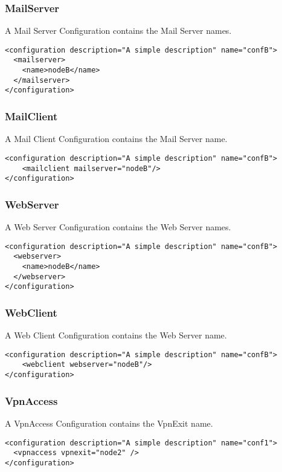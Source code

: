 \documentclass[a4paper,11pt]{article}
\begin{document}
\subsubsection*{MailServer}
A Mail Server Configuration contains the Mail Server names.
\begin{lstlisting}[label={list:ninth},caption=MailServer Configuration Example]
<configuration description="A simple description" name="confB">
  <mailserver>
  	<name>nodeB</name>
  </mailserver>
</configuration>
\end{lstlisting}
\subsubsection*{MailClient}
A Mail Client Configuration contains the Mail Server name.
\begin{lstlisting}[label={list:tenth},caption=MailClient Configuration Example]
<configuration description="A simple description" name="confB">
    <mailclient mailserver="nodeB"/>
</configuration>
\end{lstlisting}
\subsubsection*{WebServer}
A Web Server Configuration contains the Web Server names.
\begin{lstlisting}[label={list:eleventh},caption=WebServer Configuration Example]
<configuration description="A simple description" name="confB">
  <webserver>
  	<name>nodeB</name>
  </webserver>
</configuration>
\end{lstlisting}
\subsubsection*{WebClient}
A Web Client Configuration contains the Web Server name.
\begin{lstlisting}[label={list:twelfth},caption=Web Client Configuration Example]
<configuration description="A simple description" name="confB">
    <webclient webserver="nodeB"/>
</configuration>
\end{lstlisting}
\subsubsection*{VpnAccess}
A VpnAccess Configuration contains the VpnExit name.
\begin{lstlisting}[label={list:thirteenth},caption=VpnAccess Configuration Example]
<configuration description="A simple description" name="conf1">
  <vpnaccess vpnexit="node2" />
</configuration>
\end{lstlisting}
\end{document}
